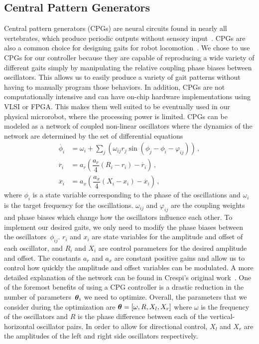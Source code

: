 \subsection{Central Pattern Generators}
\label{sec:bg:cpg}
	Central pattern generators (CPGs) are neural circuits found in nearly all vertebrates, which produce periodic outputs without sensory input~\citep{Junzhi_Yu_2014}.
	CPGs are also a common choice for designing gaits for robot locomotion~\citep{Ijspeert2008}.
    We chose to use CPGs for our controller because they are capable of reproducing a wide variety of different gaits simply by manipulating the relative coupling phase biases between oscillators. 
	This allows us to easily produce a variety of gait patterns without having to manually program those behaviors. 
	In addition, CPGs are not computationally intensive and can have on-chip hardware implementations using VLSI or FPGA. 
	This makes them well suited to be eventually used in our physical microrobot, where the processing power is limited.
	CPGs can be modeled as a network of coupled non-linear oscillators where the dynamics of the network are determined by the set of differential equations
	\begin{align}
	  \dot{\phi_i} &= \omega_{i} + \displaystyle \sum_{j} (\omega_{ij}r_j\sin(\phi_j - \phi_i - \varphi_{ij}))\,,\\
	  \ddot{r_i} &= a_r (\dfrac{a_r}{4} (R_i - r_i) - \dot{r_i})\,,\\
	  \ddot{x_i} &= a_x (\dfrac{a_x}{4} (X_i - x_i) - \dot{x_i})\,,
	\end{align}
	where $\phi_{i}$ is a state variable corresponding to the phase of the oscillations and $\omega_{i}$ is the target frequency for the oscillations. 
    $\omega_{ij}$ and $\varphi_{ij}$ are the coupling weights and phase biases which change how the oscillators influence each other.
    To implement our desired gaits, we only need to modify the phase biases between the oscillators~$\phi_{ij}$.
    $r_{i}$ and $x_{i}$ are state variables for the amplitude and offset of each oscillator, and $R_{i}$ and $X_{i}$ are control parameters for the desired amplitude and offset. 
    The constants $a_{r}$ and $a_{x}$ are constant positive gains and allow us to control how quickly the amplitude and offset variables can be modulated. 
    A more detailed explanation of the network can be found in Crespi's original work~\citep{Crespi_2007}. 
	One of the foremost benefits of using a CPG controller is a drastic reduction in the number of parameters~$\boldsymbol{\theta}_i$ we need to optimize.
    Overall, the parameters that we consider during the optimization are $\boldsymbol{\theta} = \left[\omega, R, X_{l}, X_{r} \right]$ where $\omega$ is the frequency of the oscillators and $R$ is the phase difference between each of the vertical-horizontal oscillator pairs. 
    In order to allow for directional control, $X_{l}$ and $X_{r}$ are the amplitudes of the left and right side oscillators respectively.    
    
